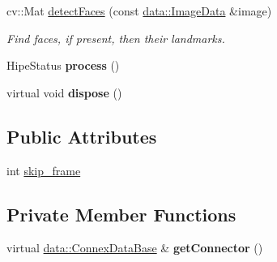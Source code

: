 \begin{DoxyCompactItemize}
cv\+::\+Mat \hyperlink{classfilter_1_1algos_1_1_face_landmark_a333f1eb7faccf486e00d654a0f396ae9}{detect\+Faces} (const \hyperlink{classfilter_1_1data_1_1_image_data}{data\+::\+Image\+Data} \&image)
\begin{DoxyCompactList}\small\item\em Find faces, if present, then their landmarks. \end{DoxyCompactList}\item 
\mbox{\label{classfilter_1_1algos_1_1_face_landmark_ab6d4e7beca4ddd5f09ee927cfe6914b3}} 
Hipe\+Status {\bfseries process} ()
\item 
\mbox{\label{classfilter_1_1algos_1_1_face_landmark_ad1c9348a4d7ada38562bab0371d92b8d}} 
virtual void {\bfseries dispose} ()
\end{DoxyCompactItemize}
\subsection*{Public Attributes}
\begin{DoxyCompactItemize}
\item 
int \hyperlink{classfilter_1_1algos_1_1_face_landmark_a6fe568dc4782d0e560947dab7417dab4}{skip\+\_\+frame}
\end{DoxyCompactItemize}
\subsection*{Private Member Functions}
\begin{DoxyCompactItemize}
\item 
\mbox{\label{classfilter_1_1algos_1_1_face_landmark_acf6eac334b8f03dea88ff93b1ab03270}} 
virtual \hyperlink{classfilter_1_1data_1_1_connex_data_base}{data\+::\+Connex\+Data\+Base} \& {\bfseries get\+Connector} ()
\end{DoxyCompactItemize}
